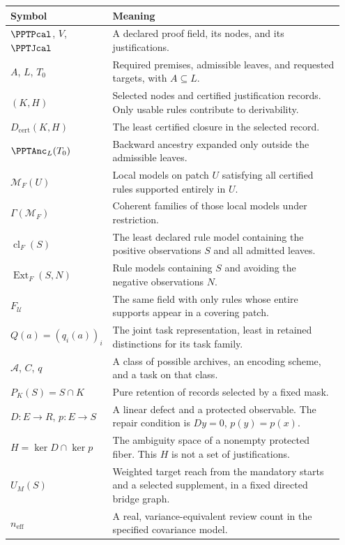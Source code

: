 \documentclass[11pt,oneside,openany]{book}
\numberwithin{equation}{section}
\begin{document}
\begingroup\small
\begin{longtable}{@{}L{0.24\linewidth}L{0.71\linewidth}@{}}
\toprule
Symbol & Meaning \\
\midrule
\endhead
$\PPTPcal$, $V$, $\PPTJcal$ & A declared proof field, its nodes, and its justifications. \\
$A$, $L$, $T_0$ & Required premises, admissible leaves, and requested targets, with $A\subseteq L$. \\
$(K,H)$ & Selected nodes and certified justification records. Only usable rules contribute to derivability. \\
$D_{\mathrm{cert}}(K,H)$ & The least certified closure in the selected record. \\
$\PPTAnc_L(T_0)$ & Backward ancestry expanded only outside the admissible leaves. \\
$\mathcal M_F(U)$ & Local models on patch $U$ satisfying all certified rules supported entirely in $U$. \\
$\Gamma(\mathcal M_F)$ & Coherent families of those local models under restriction. \\
$\operatorname{cl}_F(S)$ & The least declared rule model containing the positive observations $S$ and all admitted leaves. \\
$\operatorname{Ext}_F(S,N)$ & Rule models containing $S$ and avoiding the negative observations $N$. \\
$F_{\mathcal U}$ & The same field with only rules whose entire supports appear in a covering patch. \\
$Q(a)=(q_i(a))_i$ & The joint task representation, least in retained distinctions for its task family. \\
$\mathscr A$, $C$, $q$ & A class of possible archives, an encoding scheme, and a task on that class. \\
$P_K(S)=S\cap K$ & Pure retention of records selected by a fixed mask. \\
$D:E\to R$, $p:E\to S$ & A linear defect and a protected observable. The repair condition is $Dy=0$, $p(y)=p(x)$. \\
$H=\ker D\cap\ker p$ & The ambiguity space of a nonempty protected fiber. This $H$ is not a set of justifications. \\
$U_M(S)$ & Weighted target reach from the mandatory starts and a selected supplement, in a fixed directed bridge graph. \\
$n_{\mathrm{eff}}$ & A real, variance-equivalent review count in the specified covariance model. \\
\bottomrule
\end{longtable}
\endgroup
\end{document}
